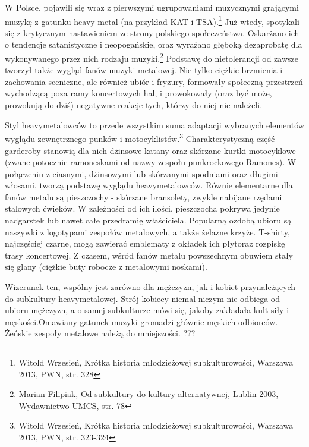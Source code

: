 \documentclass[12pt, a4paper, titlepage]{report}
\begin{document}
W Polsce, pojawili się wraz z pierwszymi ugrupowaniami muzycznymi grającymi muzykę z gatunku heavy metal (na przykład KAT i TSA).\footnote{Witold Wrzesień, Krótka historia młodzieżowej subkulturowości, Warszawa 2013, PWN, str. 328} Już wtedy, spotykali się z krytycznym nastawieniem ze strony polskiego społeczeństwa. Oskarżano ich o tendencje satanistyczne i neopogańskie, oraz wyrażano głęboką dezaprobatę dla wykonywanego przez nich rodzaju muzyki.\footnote{Marian Filipiak, Od subkultury do kultury alternatywnej, Lublin 2003, Wydawnictwo UMCS, str. 78} %
Podstawę do nietolerancji od zawsze tworzył także wygląd fanów muzyki metalowej. Nie tylko ciężkie brzmienia i zachowania sceniczne, ale również ubiór i fryzury, formowały społeczną przestrzeń wychodzącą poza ramy koncertowych hal, i prowokowały (oraz być może, prowokują do dziś) negatywne reakcje tych, którzy do niej nie należeli. 
 
Styl heavymetalowców to przede wszystkim suma adaptacji wybranych elementów wyglądu zewnętrznego punków i motocyklistów.\footnote{Witold Wrzesień, Krótka historia młodzieżowej subkulturowości, Warszawa 2013, PWN, \break str. 323-324} Charakterystyczną \break część garderoby stanowią dla nich dżinsowe katany oraz skórzane kurtki motocyklowe (zwane potocznie ramoneskami od nazwy zespołu punkrockowego Ramones). W połączeniu z ciasnymi, dżinsowymi lub skórzanymi spodniami oraz długimi włosami, tworzą podstawę wyglądu heavymetalowców. Równie elementarne dla fanów metalu są pieszczochy - skórzane bransolety, zwykle nabijane rzędami stalowych ćwieków. W zależności od ich ilości, pieszczocha pokrywa jedynie nadgarstek lub nawet całe przedramię właściciela. Popularną ozdobą ubioru są naszywki z logotypami zespołów metalowych, a także żelazne krzyże. T-shirty, najczęściej czarne, mogą zawierać emblematy z okładek ich płyt\footnotemark[\value{footnote}] oraz rozpiskę trasy koncertowej. %
Z czasem, wśród fanów metalu powszechnym obuwiem stały się glany (ciężkie buty robocze z metalowymi noskami). 

Wizerunek ten, wspólny jest zarówno dla mężczyzn, jak i kobiet przynależących do subkultury heavymetalowej. Strój kobiecy niemal niczym nie odbiega od ubioru mężczyzn, a o samej subkulturze mówi się, jakoby zakładała kult siły i męskości.\footnotemark[\value{footnote}] Omawiany gatunek muzyki gromadzi głównie męskich odbiorców. Żeńskie zespoły metalowe należą do mniejszości. ???
\end{document}
